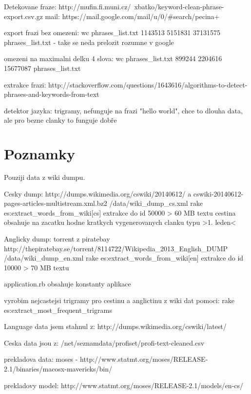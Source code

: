 Detekovane fraze:
http://mufin.fi.muni.cz/~xbatko/keyword-clean-phrase-export.csv.gz
mail: https://mail.google.com/mail/u/0/#search/pecina+%


export frazi bez omezeni:
 wc phrases_list.txt 
 1143513 5151831 37131575 phrases_list.txt
- take se neda prelozit rozumne v google

omezeni na maximalni delku 4 slova:
 wc phrases_list.txt
 899244 2204616 15677087 phrases_list.txt


extrakce frazi:
http://stackoverflow.com/questions/1643616/algorithms-to-detect-phrases-and-keywords-from-text


detektor jazyka:
trigramy, nefunguje na frazi "hello world", chce to dlouha data, ale pro bezne clanky to funguje dobře

\section{Poznamky}

Pouziji data z wiki dumpu.

Cesky dump:
http://dumps.wikimedia.org/cswiki/20140612/ a cswiki-20140612-pages-articles-multistream.xml.bz2
/data/wiki_dump_cs.xml
rake es:extract_words_from_wiki[cs]
extrakce do id 50000 > 60 MB textu
cestina obsahuje na zacatku hodne kratkych vygenerovanych clanku typu >1. leden<

Anglicky dump:
torrent z piratebay http://thepiratebay.se/torrent/8114722/Wikipedia_2013_English_DUMP
/data/wiki_dump_en.xml
rake es:extract_words_from_wiki[en]
extrakce do id 10000 > 70 MB textu

application.rb obsahuje konstanty aplikace

vyrobim nejcastejsi trigramy pro cestinu a anglictinu z wiki dat pomoci:
rake es:extract_most_frequent_trigrams

Language data jsem stahnul z:
http://dumps.wikimedia.org/cswiki/latest/

Ceska data jsou z:
/net/seznamdata/profiset/profi-text-cleaned.csv

prekladova data:
moses - http://www.statmt.org/moses/RELEASE-2.1/binaries/macosx-mavericks/bin/

prekladovy model:
http://www.statmt.org/moses/RELEASE-2.1/models/en-cs/
